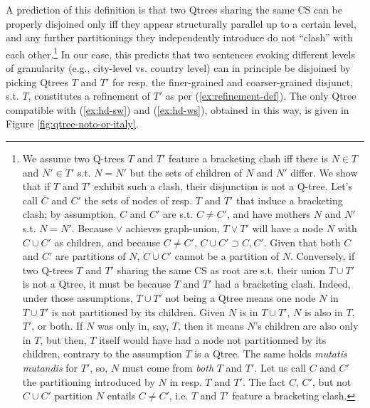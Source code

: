 	
	
	A prediction of this definition is that two Qtrees sharing the same CS can be properly disjoined only iff they appear structurally parallel up to a certain level, and any further partitionings they independently introduce do not ``clash'' with each other.\footnote{We assume two Q-trees $T$ and $T'$ feature a bracketing clash iff there is $N \in T$ and $N' \in T'$ s.t. $N=N'$ but the sets of children of $N$ and $N'$ differ. We show that if $T$ and $T'$ exhibit such a clash, their disjunction is not a Q-tree. Let's call $C$ and $C'$ the sets of nodes of resp. $T$ and $T'$ that induce a bracketing clash; by assumption, $C$ and $C'$ are s.t. $C\neq C'$, and have mothers $N$ and $N'$ s.t. $N=N'$. Because $\vee$ achieves graph-union, $T\vee T'$ will have a node $N$ with $C\cup C'$ as children, and because $C\neq C'$, $C\cup C' \supset C, C'$. Given that both $C$ and $C'$ are partitions of $N$, $C\cup C'$ cannot be a partition of $N$. Conversely, if two Q-trees $T$ and $T'$ sharing the same CS as root are s.t. their union $T \cup T'$ is not a Qtree, it must be because $T$ and $T'$ had a bracketing clash. Indeed, under those assumptions, $T \cup T'$ not being a Qtree means one node $N$ in $T \cup T'$ is not partitioned by its children. Given $N$ is in $T \cup T'$, $N$ is also in $T$, $T'$, or both. If $N$ was only in, say, $T$, then it means $N$'s children are also only in $T$, but then, $T$ itself would have had a node not partitionned by its children, contrary to the assumption $T$ is a Qtree. The same holds \textit{mutatis mutandis} for $T'$, so, $N$ must come from \textit{both} $T$ and $T'$. Let us call $C$ and $C'$ the partitioning introduced by $N$ in resp. $T$ and $T'$. The fact $C$, $C'$, but not $C \cup C'$ partition $N$ entails $C\neq C'$, i.e. $T$ and $T'$ feature a bracketing clash.}
	In our case, this predicts that two sentences evoking different levels of granularity (e.g., city-level vs. country level) can in principle be disjoined by picking Qtrees $T$ and $T'$ for resp. the finer-grained and coarser-grained disjunct, s.t. $T$, constitutes a refinement of $T'$ as per (\ref{ex:refinement-def}). The only Qtree compatible with (\ref{ex:hd-sw}) and (\ref{ex:hd-ws}), obtained in this way, is given in Figure \ref{fig:qtree-noto-or-italy}.
	

